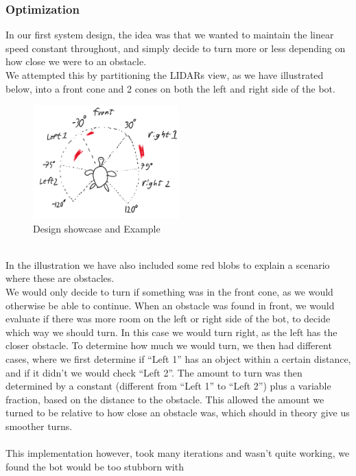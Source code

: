 \documentclass[conference]{IEEEtran}
\begin{document}
\subsubsection{Optimization}
In our first system design, the idea was that we wanted to maintain the linear speed constant throughout, and simply 
decide to turn more or less depending on how close we were to an obstacle. \\
We attempted this by partitioning the LIDARs view, as we have illustrated below, into a front cone and 2 cones on both 
the left and right side of the bot. \\
\begin{figure}[h] %
    \centering
    \includegraphics[width=0.5\textwidth]{turtleExample.png}
    \caption{Design showcase and Example}
\end{figure} \\
In the illustration we have also included some red blobs to explain a scenario where these are obstacles. \\
We would only decide to turn if something was in the front cone, as we would otherwise be able to continue. 
When an obstacle was found in front, we would evaluate if there was more room on the left or right side of the bot, 
to decide which way we should turn. In this case we would turn right, as the left has the closer obstacle. 
To determine how much we would turn, we then had different cases, where we first determine if “Left 1” has an 
object within a certain distance, and if it didn't we would check “Left 2”. The amount to turn was then determined 
by a constant (different from “Left 1” to “Left 2”) plus a variable fraction, based on the distance to the obstacle. 
This allowed the amount we turned to be relative to how close an obstacle was, which should in theory give us smoother turns.
\\\\
This implementation however, took many iterations and wasn't quite working, we found the bot would be too stubborn with 
\end{document}
